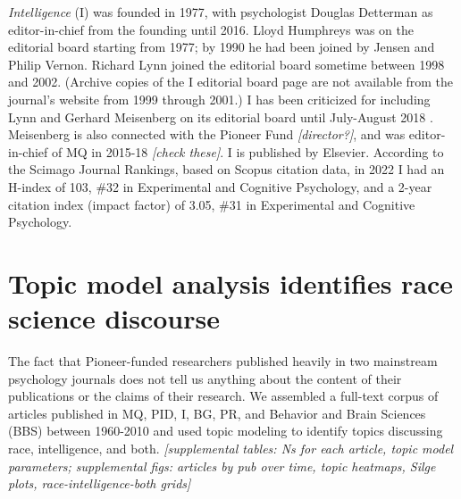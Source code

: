 \documentclass[12pt]{article}
\begin{document}
\emph{Intelligence} (I) was founded in 1977, with psychologist Douglas Detterman as editor-in-chief from the founding until 2016. Lloyd Humphreys was on the editorial board starting from 1977; by 1990 he had been joined by Jensen and Philip Vernon. Richard Lynn joined the editorial board sometime between 1998 and 2002. (Archive copies of the I editorial board page are not available from the journal's website from 1999 through 2001.) I has been criticized for including Lynn and Gerhard Meisenberg on its editorial board until July-August 2018 \cite{SainiSuperiorReturnRace2019}. Meisenberg is also connected with the Pioneer Fund \emph{{[}director?{]}}, and was editor-in-chief of MQ in 2015-18 \emph{{[}check these{]}}. I is published by Elsevier. According to the Scimago Journal Rankings, based on Scopus citation data, in 2022 I had an H-index of 103, \#32 in Experimental and Cognitive Psychology, and a 2-year citation index (impact factor) of 3.05, \#31 in Experimental and Cognitive Psychology.

\hypertarget{topic-model-analysis-identifies-race-science-discourse}{%
\section*{Topic model analysis identifies race science discourse}\label{topic-model-analysis-identifies-race-science-discourse}}

The fact that Pioneer-funded researchers published heavily in two mainstream psychology journals does not tell us anything about the content of their publications or the claims of their research. We assembled a full-text corpus of articles published in MQ, PID, I, BG, PR, and Behavior and Brain Sciences (BBS) between 1960-2010 and used topic modeling to identify topics discussing race, intelligence, and both. \emph{{[}supplemental tables: Ns for each article, topic model parameters; supplemental figs: articles by pub over time, topic heatmaps, Silge plots, race-intelligence-both grids{]}}
\end{document}
